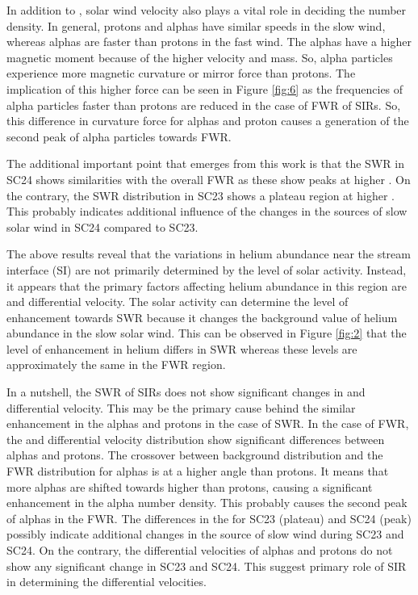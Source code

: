 \documentclass[letters,usenatbib]{mnras}
\begin{document}
In addition to , solar wind velocity also plays a vital role in deciding the number density. In general, protons and alphas have similar speeds in the slow wind, whereas alphas are faster than protons in the fast wind. The alphas have a higher magnetic moment because of the higher velocity and mass. So, alpha particles experience more magnetic curvature or mirror force than protons. The implication of this higher force can be seen in Figure \ref{fig:6} as the frequencies of alpha particles faster than protons are reduced in the case of FWR of SIRs. So, this difference in curvature force for alphas and proton causes a generation of the second peak of alpha particles towards FWR. 

  	The additional important point that emerges from this work is that the SWR  in SC24 shows similarities with the overall FWR   as these show peaks    at higher . On the contrary, the SWR distribution in SC23 shows a plateau region at higher . This probably indicates additional influence of the changes in the sources of slow solar wind in SC24 compared to SC23. 

The above results reveal that the variations in helium abundance near the stream interface (SI) are not primarily determined by the level of solar activity. Instead, it appears that the primary factors affecting helium abundance in this region are  and differential velocity. The solar activity can determine the level of enhancement towards SWR because it changes the background value of helium abundance in the slow solar wind. This can be observed in Figure \ref{fig:2} that the level of enhancement in helium differs in SWR whereas these levels are approximately the same in the FWR region. 



In a nutshell, the SWR of SIRs does not show significant changes in  and differential velocity. This may be the primary cause behind the similar enhancement in the alphas and protons  in the case of SWR. In the case of FWR, the  and differential velocity distribution show significant differences between alphas and protons. The crossover between background distribution and the FWR distribution for alphas is at a higher angle than protons. It means that more alphas are shifted towards higher  than protons, causing a significant enhancement in the alpha number density. This probably causes the second peak of alphas in the FWR. The differences in the  for SC23 (plateau) and SC24 (peak) possibly indicate additional changes in the source of slow wind during SC23 and SC24. On the contrary, the differential velocities of alphas and protons do not show any significant change in SC23 and SC24. This suggest primary role of SIR in determining the differential velocities. 
\end{document}
